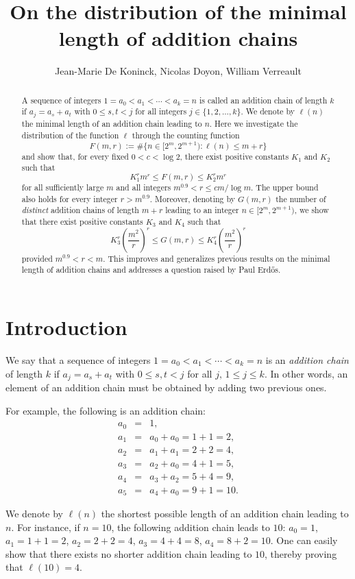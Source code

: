 \documentclass{article}
\title{On the distribution of the minimal length of addition chains}
\author{Jean-Marie De Koninck, Nicolas Doyon, William Verreault}
\date{}
\theoremstyle{definition}
\begin{document}
\maketitle

\begin{abstract}

A sequence of integers $1=a_0<a_1<\cdots<a_k=n$ is called an addition chain of length $k$ if $a_j=a_s+a_t$ with $0\le s,t<j$ for all integers $j\in \{1,2,\ldots,k\}$. We denote by $\ell(n)$ the minimal length of an addition chain leading to $n$. Here we investigate the distribution of the function $\ell$ through the counting function
$$
F(m,r):=\#\{n\in [2^m,2^{m+1}):\ell(n)\le m+r\}
$$
and show that, for every fixed $0<c<\log 2$, there exist
positive constants $K_1$ and $K_2$
such that
$$
K_1^r m^r\le F(m,r)\le K_2^r m^r
$$
for all sufficiently large $m$ and all integers
$m^{0.9}<r\le cm/\log m$. The upper bound also holds for every integer $r>m^{0.9}$. Moreover, denoting by $G(m,r)$ the number of \emph{distinct} addition chains of length $m+r$ leading to an integer $n\in [2^m, 2^{m+1})$, we show that there exist positive constants $K_3$ and $K_4$ such that
$$
K_3^r \left(\frac{m^2}{r}\right)^r\le G\left(m,r\right)\le  K_4^r \left(\frac{m^2}{r} \right)^r
$$
provided $m^{0.9}<r<m$. This improves and generalizes previous results on the minimal length of addition chains and addresses a question raised by Paul Erd\H{o}s.
\end{abstract}




\section{Introduction}
We say that a sequence of integers $1=a_0<a_1<\cdots<a_k=n$ is an {\it addition chain} of length $k$ if $a_j=a_s+a_t$ with $0\le s,t<j$ for all $j,\, 1\le j\le k$. In other words, an element of an addition chain must be obtained by adding two previous ones.

For example, the following is an addition chain:
\begin{eqnarray*}
a_0&=&1,\\
a_1&=&a_0+a_0=1+1=2,\\
a_2&=&a_1+a_1=2+2=4,\\
a_3&=&a_2+a_0=4+1=5,\\
a_4&=&a_3+a_2=5+4=9,\\
a_5&=&a_4+a_0=9+1=10.
\end{eqnarray*}

We denote by $\ell(n)$ the shortest possible length of an addition chain leading to $n$.  For instance, if $n=10$, the following addition chain leads to $10$: $a_0=1$, $a_1=1+1=2$, $a_2=2+2=4$, $a_3=4+4=8$, $a_4=8+2=10$.  One can easily show that there exists no shorter addition chain leading to $10$, thereby proving that $\ell(10)=4$.
\end{document}
